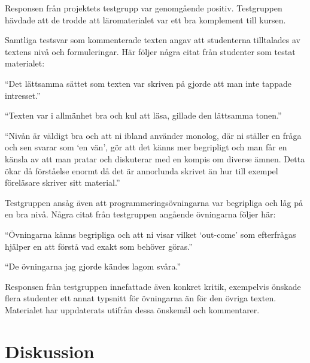 \documentclass[12pt,a4paper,twoside,openright]{article}
\begin{document}
Responsen från projektets testgrupp var genomgående
positiv. Testgruppen hävdade att de trodde att läromaterialet var ett
bra komplement till kursen.

Samtliga testsvar som kommenterade texten angav att studenterna
tilltalades av textens nivå och formuleringar. Här följer några citat
från studenter som testat materialet:
\begin{displayquote}
  ``Det lättsamma sättet som texten var skriven på gjorde att man
  inte tappade intresset.''
\end{displayquote}

\begin{displayquote}
  ``Texten var i allmänhet bra och kul att läsa, gillade den
  lättsamma tonen.''
\end{displayquote}

\begin{displayquote}
  ``Nivån är väldigt bra och att ni ibland använder monolog, där
  ni ställer en fråga och sen svarar som `en vän', gör att det känns
  mer begripligt och man får en känsla av att man pratar och
  diskuterar med en kompis om diverse ämnen. Detta ökar då förståelse
  enormt då det är annorlunda skrivet än hur till exempel föreläsare
  skriver sitt material.''
\end{displayquote}

Testgruppen ansåg även att programmeringsövningarna var begripliga och
låg på en bra nivå. Några citat från testgruppen angående övningarna
följer här:

\begin{displayquote}
  ``Övningarna känns begripliga och att ni visar vilket `out-come'
  som efterfrågas hjälper en att förstå vad exakt som behöver göras.''
\end{displayquote}

\begin{displayquote}
  ``De övningarna jag gjorde kändes lagom svåra.''
\end{displayquote}

Responsen från testgruppen innefattade även konkret kritik, exempelvis
önskade flera studenter ett annat typsnitt för övningarna än för den
övriga texten. Materialet har uppdaterats utifrån dessa önskemål och
kommentarer.

\newpage

\section{Diskussion}
\label{sec:diskussion}
\end{document}
